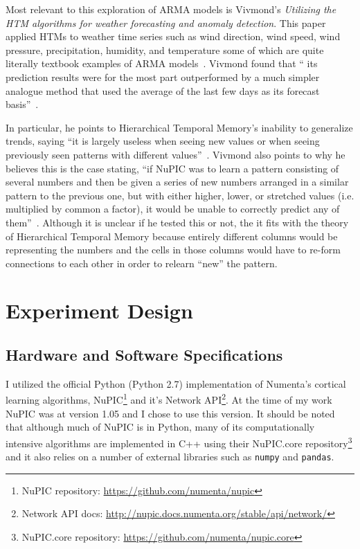 \documentclass[oneside,12pt,openany]{book}
\begin{document}
	Most relevant to this exploration of ARMA models is Vivmond's \textit{Utilizing the HTM algorithms for weather forecasting and anomaly detection}. This paper applied HTMs to weather time series such as wind direction, wind speed, wind pressure, precipitation, humidity, and temperature some of which are quite literally textbook examples of ARMA models~\cite{Box,WeatherForecast}. Vivmond found that `` its prediction results were for the most part outperformed by a much simpler analogue method that used the average of the last few days as its forecast basis''~\cite{WeatherForecast}. 
	
	In particular, he points to Hierarchical Temporal Memory's inability to generalize trends, saying ``it is largely useless when seeing new values or when seeing previously seen patterns with different values''~\cite{WeatherForecast}. Vivmond also points to why he believes this is the case stating, ``if NuPIC was to learn a pattern consisting of several numbers and then be given a series of new numbers arranged in a similar pattern to the previous one, but with either higher, lower, or stretched values (i.e. multiplied by common a factor), it would be unable to correctly predict any of them''~\cite{WeatherForecast}. Although it is unclear if he tested this or not, the it fits with the theory of Hierarchical Temporal Memory because entirely different columns would be representing the numbers and the cells in those columns would have to re-form connections to each other in order to relearn ``new'' the pattern.
	
	
	
	
	
	\chapter{Experiment Design}
	
	\section{Hardware and Software Specifications}
	
	I utilized the official Python (Python 2.7) implementation of Numenta's cortical learning algorithms, NuPIC\footnote{NuPIC repository: \href{https://github.com/numenta/nupic}{\ttfamily https://github.com/numenta/nupic} } and it's Network API\footnote{Network API docs: \href{http://nupic.docs.numenta.org/stable/api/network/}{\ttfamily http://nupic.docs.numenta.org/stable/api/network/}}. At the time of my work NuPIC was at version 1.05 and I chose to use this version. It should be noted that although much of NuPIC is in Python, many of its computationally intensive algorithms are implemented in C++ using their NuPIC.core repository\footnote{NuPIC.core repository: \href{https://github.com/numenta/nupic.core}{\ttfamily https://github.com/numenta/nupic.core}} and it also relies on a number of external libraries such as \texttt{numpy} and \texttt{pandas}. 
	
\end{document}
